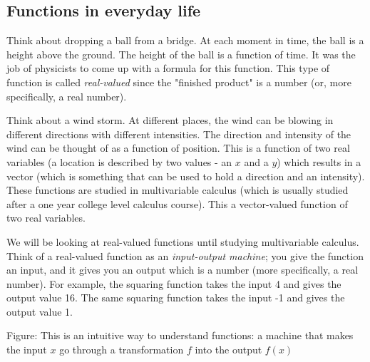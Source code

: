 \subsection{Functions in everyday life}
\label{sss:func-5465}




Think about dropping a ball from a bridge. At each moment in time, the ball is a height
above the ground. The height of the ball is a function of time. It was the job of
physicists to come up with a formula for this function. This type of function is called
\textit{real-valued} since the "finished product" is a number (or, more specifically, a
real number).



Think about a wind storm. At different places, the wind can be blowing in different
directions with different intensities. The direction and intensity of the wind can be
thought of as a function of position. This is a function of two real variables (a location
is described by two values - an $x$ and a $y$) which results in a vector (which is
something that can be used to hold a direction and an intensity). These functions are
studied in multivariable calculus (which is usually studied after a one year college level
calculus course). This a vector-valued function of two real variables.



We will be looking at real-valued functions until studying multivariable calculus. Think
of a real-valued function as an \textit{input-output machine}; you give the function an
input, and it gives you an output which is a number (more specifically, a real number).
For example, the squaring function takes the input 4 and gives the output value 16. The
same squaring function takes the input -1 and gives the output value 1.






Figure: This is an intuitive way to understand functions: a machine that makes the input
$x$ go through a transformation $f$ into the output $f(x)$




